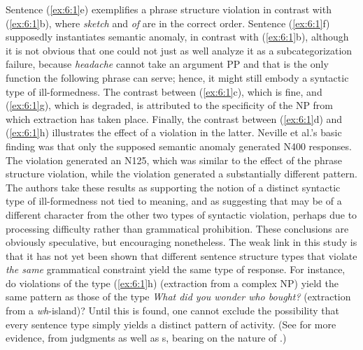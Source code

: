  \noindent
 Sentence (\ref{ex:6:1}e) exemplifies a phrase structure violation in contrast with (\ref{ex:6:1}b), where
 \textit{sketch} and \textit{of} are in the correct order. Sentence (\ref{ex:6:1}f)
 supposedly
 instantiates semantic anomaly, in contrast with (\ref{ex:6:1}b), although it is not obvious that one could not just as well analyze it as a subcategorization failure, because \textit{headache} cannot take an argument PP and that is the only function the following phrase can serve; hence, it might still embody a syntactic type of ill-formedness. The contrast between  (\ref{ex:6:1}c), which  is fine,  and  (\ref{ex:6:1}g), which  is degraded,  is attributed  to  the specificity of the NP from which extraction has taken place. Finally, the contrast between (\ref{ex:6:1}d) and (\ref{ex:6:1}h) illustrates the effect of a  violation in the latter. Neville et al.'s basic finding was that only the supposed semantic anomaly generated N400 responses. The   violation generated an N125, which was similar to the effect of the phrase structure violation, while the  violation generated a substantially different pattern. The authors take these results
 as supporting the notion of a distinct syntactic type of ill-formedness not tied to meaning, and as suggesting that  may be of a different character from the other two types of syntactic violation, perhaps due to processing difficulty rather than grammatical prohibition. These conclusions are obviously speculative, but encouraging nonetheless. The weak link in this study is that it has not yet been shown that different sentence structure types that violate \textit{the same} grammatical constraint yield the same type of  response. For instance, do  violations of the type (\ref{ex:6:1}h) (extraction from a complex NP) yield the same pattern as those of the type \textit{What did you wonder who bought?} (extraction from a \textit{wh}-island)? Until this is found, one cannot exclude the possibility that every sentence type simply yields a distinct pattern of activity. (See \citet{KluenderEtAl1993} for more evidence, from judgments as well as s, bearing on the nature of .)

